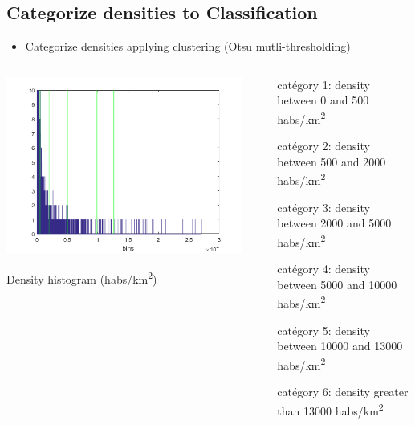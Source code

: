 \documentclass[c]{beamer}
\begin{document}
\subsection{Categorize densities to Classification}
\begin{frame}
\begin{itemize}
 \item Categorize densities applying clustering (Otsu mutli-thresholding)
\end{itemize}

\begin{columns}
 \begin{column}{0.50\textwidth}
  \begin{overlayarea}{\linewidth}{3cm}
  \centering\vfill
  \includegraphics[scale=0.25]{images/labels/densite_histo_otsu_zoom.png}
  \end{overlayarea}
  \begin{overlayarea}{\linewidth}{0.5cm}
  \centering
  \tiny Density histogram (habs/km\textsuperscript{2})\par
  \end{overlayarea}
 \end{column}
 \begin{column}{0.50\textwidth}
  \begin{overlayarea}{\linewidth}{3cm}
  {\tiny
    \begin{itemize}
    \item[catégory 1:] density between 0 and 500 habs/km\textsuperscript{2}
    \item[catégory 2:] density between 500 and 2000 habs/km\textsuperscript{2}
    \item[catégory 3:] density between 2000 and 5000 habs/km\textsuperscript{2}
    \item[catégory 4:] density between 5000 and 10000 habs/km\textsuperscript{2}
    \item[catégory 5:] density between 10000 and 13000 habs/km\textsuperscript{2}
    \item[catégory 6:] density greater than 13000 habs/km\textsuperscript{2}
    \end{itemize}
  }
  \end{overlayarea}
 \end{column}
\end{columns}


\end{frame}
\end{document}
